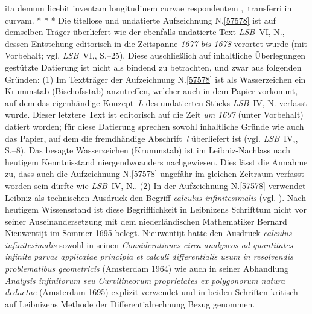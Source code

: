 ita demum licebit
inventam longitudinem
curvae respondentem%
\lbrack,\rbrack\
transferri in curvam.
\pend%
\newpage%
\vspace{3.0em}%
\pstart%
\noindent%
\centering%
*     *     *
\pend%
\vspace{4.0em}%
%
\frenchspacing%
\footnotesize%
\pstart%
\noindent%
%
Die titellose und undatierte Aufzeichnung N.\;\ref{57578} ist auf demselben Träger überliefert wie der ebenfalls undatierte Text \textit{LSB}~VI, N.,\cite{01490} dessen Entstehung editorisch in die Zeitspanne \textit{1677 bis 1678} verortet wurde (mit Vorbehalt; vgl. \textit{LSB}~VI,, S.--25).
Diese auschließlich auf inhaltliche Überlegungen gestützte Datierung ist nicht als bindend zu betrachten, und zwar aus folgenden Gründen:
\pend%
\pstart%
(1) Im Textträger der Aufzeichnung N.\;\ref{57578} ist als Wasserzeichen ein Krummstab (Bischofsstab) anzutreffen, welcher auch in dem Papier vorkommt, auf dem das eigenhändige Konzept~\textit{L} des undatierten Stücks \textit{LSB}~IV, N.\cite{01491} verfasst wurde.
Dieser letztere Text ist editorisch auf die Zeit \textit{um 1697} (unter Vorbehalt) datiert worden; für diese Datierung sprechen sowohl inhaltliche Gründe wie auch das Papier, auf dem die fremdhändige Abschrift~\textit{l} überliefert ist (vgl. \textit{LSB}~IV,\;7, S.\;160.1–8).\cite{01491}
Das besagte Wasserzeichen (Krummstab) ist im Leibniz-Nachlass nach heutigem Kenntnisstand niergendwoanders nachgewiesen.
Dies lässt die Annahme zu, dass auch die Aufzeichnung N.\;\ref{57578} ungefähr im gleichen Zeitraum verfasst worden sein dürfte wie \textit{LSB}~IV, N.\cite{01491}.
\pend%
\pstart%
(2) In der Aufzeichnung N.\;\ref{57578} verwendet Leibniz als technischen Ausdruck den Begriff \textit{calculus infinitesimalis} (vgl. ).
Nach heutigem Wissensstand ist diese Begrifflichkeit in Leibnizens Schrifttum nicht vor seiner Auseinandersetzung mit dem niederländischen Mathematiker Bernard Nieuwentijt im Sommer 1695 belegt.
Nieuwentijt\indexN{\textls{Nieuwentijt}, Bernard 1654\textendash1718} hatte den Ausdruck \textit{calculus infinitesimalis} sowohl in seinen \textit{Considerationes circa analyseos ad quantitates infinite parvas applicatae principia et calculi differentialis usum in resolvendis problematibus geometricis} (Amsterdam 1964)\cite{01494} wie auch in seiner Abhandlung \textit{Analysis infinitorum seu Curvilineorum proprietates ex polygonorum natura deductae} (Amsterdam 1695)\cite{01495} explizit verwendet und in beiden Schriften kritisch auf Leibnizens Methode der Differentialrechnung Bezug genommen.
